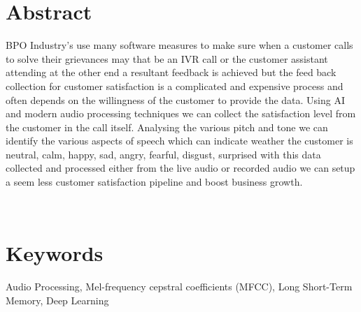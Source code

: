 \section*{Abstract}
\footnotesize BPO Industry's use many software measures to make sure when a customer calls to solve their grievances may that be an IVR call or the customer assistant attending at the other end a resultant feedback is achieved but  the feed back collection for customer satisfaction is a complicated and expensive process and often depends on the willingness of the customer to provide the data. Using AI and modern audio processing techniques we can collect the satisfaction level from the customer in the call itself. Analysing the various pitch and tone we can identify the various aspects of speech which can indicate weather the customer is neutral, calm, happy, sad, angry, fearful, disgust, surprised with this data collected and processed either from the live audio or recorded audio we can setup a seem less customer satisfaction pipeline and boost business growth.    \par \\
\section*{Keywords}
\footnotesize Audio Processing, Mel-frequency cepstral coefficients (MFCC), Long Short-Term Memory, Deep Learning \par 